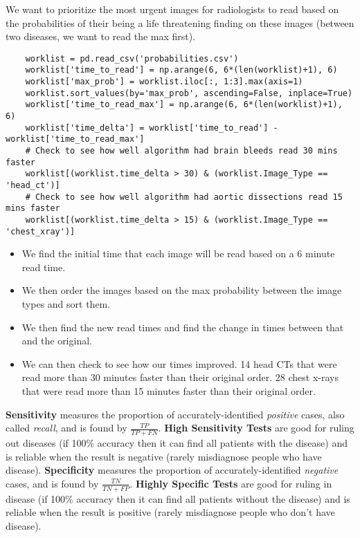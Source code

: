 \documentclass[11pt, a4paper]{article}
\begin{document}
	We want to prioritize the most urgent images for radiologists to read based on the probabilities of their being a life threatening finding on these images (between two diseases, we want to read the max first). \vspace*{1mm}
	\begin{lstlisting}
	worklist = pd.read_csv('probabilities.csv')
	worklist['time_to_read'] = np.arange(6, 6*(len(worklist)+1), 6)
	worklist['max_prob'] = worklist.iloc[:, 1:3].max(axis=1)
	worklist.sort_values(by='max_prob', ascending=False, inplace=True)
	worklist['time_to_read_max'] = np.arange(6, 6*(len(worklist)+1), 6)
	worklist['time_delta'] = worklist['time_to_read'] - worklist['time_to_read_max']
	# Check to see how well algorithm had brain bleeds read 30 mins faster
	worklist[(worklist.time_delta > 30) & (worklist.Image_Type == 'head_ct')]
	# Check to see how well algorithm had aortic dissections read 15 mins faster
	worklist[(worklist.time_delta > 15) & (worklist.Image_Type == 'chest_xray')] \end{lstlisting}
	\begin{itemize}
		\item We find the initial time that each image will be read based on a 6 minute read time.
		\item We then order the images based on the max probability between the image types and sort them.
		\item We then find the new read times and find the change in times between that and the original.
		\item We can then check to see how our times improved. 14 head CTs that were read more than 30 minutes faster than their original order. 28 chest x-rays that were read more than 15 minutes faster than their original order.
	\end{itemize}
	\textbf{Sensitivity} measures the proportion of accurately-identified \textit{positive} cases, also called \textit{recall}, and is found by $\frac{TP}{TP + FN}$. \textbf{High Sensitivity Tests} are good for ruling out diseases (if 100\% accuracy then it can find all patients with the disease) and is reliable when the result is negative (rarely misdiagnose people who have disease). \textbf{Specificity} measures the proportion of accurately-identified \textit{negative} cases, and is found by $\frac{TN}{TN+FP}$. \textbf{Highly Specific Tests} are good for ruling in disease (if 100\% accuracy then it can find all patients without the disease) and is reliable when the result is positive (rarely misdiagnose people who don't have disease). \newpage
	
\end{document}

